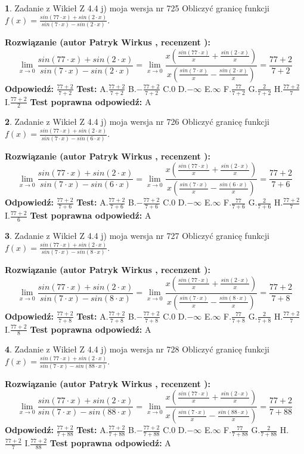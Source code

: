 \documentclass[12pt, a4paper]{article}
\theoremstyle{definition} %
\newtheorem{zad}{}
\newcommand{\zadStart}[1]{\begin{zad}#1\newline}
\newcommand{\zadStop}{\end{zad}}
\newcommand{\rozwStart}[2]{\noindent \textbf{Rozwiązanie (autor #1 , recenzent #2): }\newline}
\newcommand{\rozwStop}{\newline}
\newcommand{\odpStart}{\noindent \textbf{Odpowiedź:}\newline}
\newcommand{\odpStop}{\newline}
\newcommand{\testStart}{\noindent \textbf{Test:}\newline}
\newcommand{\testStop}{\newline}
\newcommand{\kluczStart}{\noindent \textbf{Test poprawna odpowiedź:}\newline}
\newcommand{\kluczStop}{\newline}
\begin{document}
\zadStart{Zadanie z Wikieł Z 4.4 j) moja wersja nr 725}
Obliczyć granicę funkcji $f(x)=\frac{sin(77\cdot x) +sin(2\cdot x)}{sin(7\cdot x) -sin(2\cdot x)}$.
\zadStop
\rozwStart{Patryk Wirkus}{}
$$\lim\limits_{x\to 0}\frac{sin(77\cdot x) +sin(2\cdot x)}{sin(7\cdot x) -sin(2\cdot x)}=\lim\limits_{x\to 0}\frac{x(\frac{sin(77\cdot x)}{x}+\frac{sin(2\cdot x)}{x})}{x(\frac{sin(7\cdot x)}{x}-\frac{sin(2\cdot x)}{x})}=\frac{77+2}{7+2}$$
\rozwStop
\odpStart
$\frac{77+2}{7+2}$
\odpStop
\testStart
A.$\frac{77+2}{7+2}$
B.$-\frac{77+2}{7+2}$
C.$0$
D.$-\infty$
E.$\infty$
F.$\frac{77}{7+2}$
G.$\frac{2}{7+2}$
H.$\frac{77+2}{7}$
I.$\frac{77+2}{2}$
\testStop
\kluczStart
A
\kluczStop



\zadStart{Zadanie z Wikieł Z 4.4 j) moja wersja nr 726}
Obliczyć granicę funkcji $f(x)=\frac{sin(77\cdot x) +sin(2\cdot x)}{sin(7\cdot x) -sin(6\cdot x)}$.
\zadStop
\rozwStart{Patryk Wirkus}{}
$$\lim\limits_{x\to 0}\frac{sin(77\cdot x) +sin(2\cdot x)}{sin(7\cdot x) -sin(6\cdot x)}=\lim\limits_{x\to 0}\frac{x(\frac{sin(77\cdot x)}{x}+\frac{sin(2\cdot x)}{x})}{x(\frac{sin(7\cdot x)}{x}-\frac{sin(6\cdot x)}{x})}=\frac{77+2}{7+6}$$
\rozwStop
\odpStart
$\frac{77+2}{7+6}$
\odpStop
\testStart
A.$\frac{77+2}{7+6}$
B.$-\frac{77+2}{7+6}$
C.$0$
D.$-\infty$
E.$\infty$
F.$\frac{77}{7+6}$
G.$\frac{2}{7+6}$
H.$\frac{77+2}{7}$
I.$\frac{77+2}{6}$
\testStop
\kluczStart
A
\kluczStop



\zadStart{Zadanie z Wikieł Z 4.4 j) moja wersja nr 727}
Obliczyć granicę funkcji $f(x)=\frac{sin(77\cdot x) +sin(2\cdot x)}{sin(7\cdot x) -sin(8\cdot x)}$.
\zadStop
\rozwStart{Patryk Wirkus}{}
$$\lim\limits_{x\to 0}\frac{sin(77\cdot x) +sin(2\cdot x)}{sin(7\cdot x) -sin(8\cdot x)}=\lim\limits_{x\to 0}\frac{x(\frac{sin(77\cdot x)}{x}+\frac{sin(2\cdot x)}{x})}{x(\frac{sin(7\cdot x)}{x}-\frac{sin(8\cdot x)}{x})}=\frac{77+2}{7+8}$$
\rozwStop
\odpStart
$\frac{77+2}{7+8}$
\odpStop
\testStart
A.$\frac{77+2}{7+8}$
B.$-\frac{77+2}{7+8}$
C.$0$
D.$-\infty$
E.$\infty$
F.$\frac{77}{7+8}$
G.$\frac{2}{7+8}$
H.$\frac{77+2}{7}$
I.$\frac{77+2}{8}$
\testStop
\kluczStart
A
\kluczStop



\zadStart{Zadanie z Wikieł Z 4.4 j) moja wersja nr 728}
Obliczyć granicę funkcji $f(x)=\frac{sin(77\cdot x) +sin(2\cdot x)}{sin(7\cdot x) -sin(88\cdot x)}$.
\zadStop
\rozwStart{Patryk Wirkus}{}
$$\lim\limits_{x\to 0}\frac{sin(77\cdot x) +sin(2\cdot x)}{sin(7\cdot x) -sin(88\cdot x)}=\lim\limits_{x\to 0}\frac{x(\frac{sin(77\cdot x)}{x}+\frac{sin(2\cdot x)}{x})}{x(\frac{sin(7\cdot x)}{x}-\frac{sin(88\cdot x)}{x})}=\frac{77+2}{7+88}$$
\rozwStop
\odpStart
$\frac{77+2}{7+88}$
\odpStop
\testStart
A.$\frac{77+2}{7+88}$
B.$-\frac{77+2}{7+88}$
C.$0$
D.$-\infty$
E.$\infty$
F.$\frac{77}{7+88}$
G.$\frac{2}{7+88}$
H.$\frac{77+2}{7}$
I.$\frac{77+2}{88}$
\testStop
\kluczStart
A
\kluczStop
\end{document}
